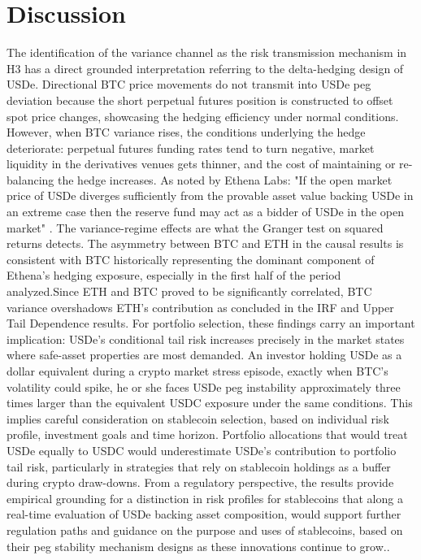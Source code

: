 \documentclass[12pt,a4paper,titlepage,oneside,english]{article}
\begin{document}
\section{Discussion}
The identification of the variance channel as the risk transmission mechanism in H3 has a direct grounded interpretation referring to the delta-hedging design of USDe. Directional BTC price movements do not transmit into USDe peg deviation because the short perpetual futures position is constructed to offset spot price changes, showcasing the hedging efficiency under normal conditions. However, when BTC variance rises, the conditions underlying the hedge deteriorate: perpetual futures funding rates tend to turn negative, market liquidity in the derivatives venues gets thinner, and the cost of maintaining or re-balancing the hedge increases. As noted by Ethena Labs: "If the open market price of USDe diverges sufficiently from the provable asset value backing USDe in an extreme case then the reserve fund may act as a bidder of USDe in the open market" \parencite{ethena_docs}. The variance-regime effects are what the Granger test on squared returns detects. The asymmetry between BTC and ETH in the causal results is consistent with BTC historically representing the dominant component of Ethena's hedging exposure, especially in the first half of the period analyzed.Since ETH and BTC proved to be significantly correlated, BTC variance overshadows ETH's contribution as concluded in the IRF and Upper Tail Dependence results. For portfolio selection, these findings carry an important implication: USDe's conditional tail risk increases precisely in the market states where safe-asset properties are most demanded. An investor holding USDe as a dollar equivalent during a crypto market stress episode, exactly when BTC's volatility could spike, he or she faces USDe peg instability approximately  three times larger than the equivalent USDC exposure under the same conditions. This implies careful consideration on stablecoin selection, based on individual risk profile, investment goals and time horizon. Portfolio allocations that would treat USDe equally to USDC would underestimate USDe's contribution to portfolio tail risk, particularly in strategies that rely on stablecoin holdings as a buffer during crypto draw-downs. From a regulatory perspective, the results provide empirical grounding for a distinction in risk profiles for stablecoins that along a real-time evaluation of USDe backing asset composition, would support further regulation paths and guidance on the purpose and uses of stablecoins, based on their peg stability mechanism designs as these innovations continue to grow..
\end{document}
